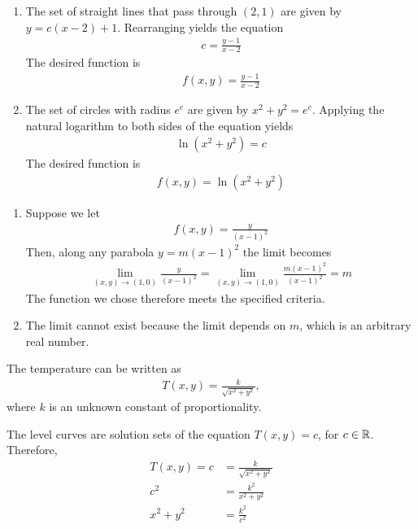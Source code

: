 \item
\begin{enumerate}
\item The set of straight lines that pass through $(2,1)$ are given by $y = c(x-2) + 1$. Rearranging yields the equation 
\begin{align*}
c = \frac{y-1}{x-2}
\end{align*}
The desired function is 
\begin{align*}
f(x,y) = \frac{y-1}{x-2}
\end{align*}
\item The set of circles with radius $e^c$ are given by $x^2 + y^2 = e^c$. Applying the natural logarithm to both sides of the equation yields 
\begin{align*}
\ln(x^2+y^2) = c
\end{align*}
The desired function is 
\begin{align*}
f(x,y) =\ln(x^2+y^2)
\end{align*}\end{enumerate}
\item 
\begin{enumerate}
\item
Suppose we let 
\begin{align*}
f(x,y) = \frac{y}{(x-1)^2}
\end{align*}
Then, along any parabola $y = m(x-1)^2$ the limit becomes
\begin{align*}
\lim_{(x,y)\rightarrow(1,0) } \frac{y}{(x-1)^2} = \lim_{(x,y)\rightarrow(1,0) } \frac{m(x-1)^2}{(x-1)^2} = m
\end{align*}
The function we chose therefore meets the specified criteria.
\item
The limit cannot exist because the limit depends on $m$, which is an arbitrary real number.
\end{enumerate}
\item 
\BEN
\item The temperature can be written as 
\begin{align*}T(x,y) = \frac{k}{\sqrt{x^2 + y^2}},\end{align*} 
where $k$ is an unknown constant of proportionality.
\item The level curves are solution sets of the equation $T(x,y)=c$, for $c\in\mathbb{R}$. Therefore,
\begin{align*}
  T(x,y) = c &= \frac{k}{\sqrt{x^2 + y^2}} \\
  c^2 &= \frac{k^2}{x^2 + y^2} \\
  x^2 + y^2 &= \frac{k^2}{c^2}
\end{align*} 
